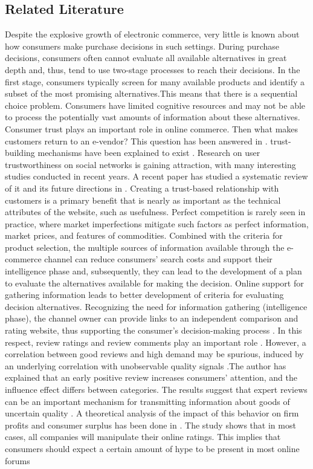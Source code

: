 \documentclass[conference]{IEEEtran}
\theoremstyle{plain}
\theoremstyle{definition}
\theoremstyle{remark}
\begin{document}
	\subsection{Related Literature}
	Despite the explosive growth of electronic commerce, very little is known about how consumers make purchase decisions in such settings. During purchase decisions, consumers often cannot evaluate all available alternatives in great depth and, thus, tend to use two-stage processes to reach their decisions. In the first stage, consumers typically screen for many available products and identify a subset of the most promising alternatives\citep{haubl2000consumer}.This means that there is a sequential choice problem. Consumers have limited cognitive resources and may not be able to process the potentially vast amounts of information about these alternatives. Consumer trust plays an important role in online commerce. Then what makes customers return to an e-vendor? This question has been answered in \citep{gefen2003trust}. trust-building mechanisms have been explained to exist \citep{awad2008establishing}. Research on user trustworthiness on social networks is gaining attraction, with many interesting studies conducted in recent years. A recent paper has studied a systematic review of it and its future directions in \citep{alkhamees2021user}. Creating a trust-based relationship with customers is a primary benefit that is nearly as important as the technical attributes of the website, such as usefulness. Perfect competition is rarely seen in practice, where market imperfections mitigate such factors as perfect information, market prices, and features of commodities. Combined with the criteria for product selection, the multiple sources of information available through the e-commerce channel can reduce consumers' search costs and support their intelligence phase and, subsequently, they can lead to the development of a plan to evaluate the alternatives available for making the decision. Online support for gathering information leads to better development of criteria for evaluating decision alternatives. Recognizing the need for information gathering (intelligence phase), the channel owner can provide links to an independent comparison and rating website, thus supporting the consumer's decision-making process \citep{kohli2004understanding}. In this respect, review ratings and review comments play an important role \citep{zhang2023reviewfeatures}. However, a correlation between good reviews and high demand may be spurious, induced by an underlying correlation with unobservable quality signals \citep{reinstein2005influence}.The author has explained that an early positive review increases consumers' attention, and the influence effect differs between categories. The results suggest that expert reviews can be an important mechanism for transmitting information about goods of uncertain quality \citep{reinstein2005influence}. A theoretical analysis of the impact of this behavior on firm profits and consumer surplus has been done in \citep{dellarocas2006strategic}. The study shows that in most cases, all companies will manipulate their online ratings. This implies that consumers should expect a certain amount of hype to be present in most online forums 
\end{document}
